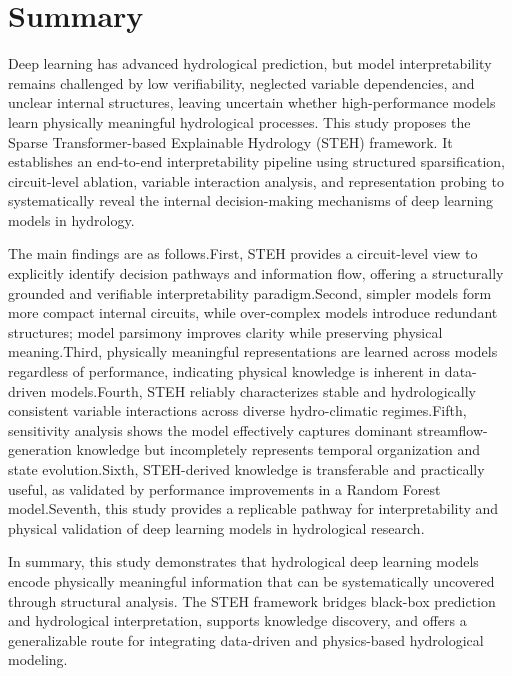\section{Summary}

Deep learning has advanced hydrological prediction, but model interpretability remains challenged by low verifiability, neglected variable dependencies\cite{e24050687_Shap_problem}, and unclear internal structures\cite{kumar2020_Shap_problem}, leaving uncertain whether high-performance models learn physically meaningful hydrological processes\cite{ReviewOfXAI}.
This study proposes the Sparse Transformer-based Explainable Hydrology (STEH) framework. It establishes an end-to-end interpretability pipeline using structured sparsification, circuit-level ablation, variable interaction analysis\cite{wang2022interpretabilitywildcircuitindirect}, and representation probing to systematically reveal the internal decision-making mechanisms of deep learning models in hydrology.

The main findings are as follows.First, STEH provides a circuit-level view to explicitly identify decision pathways and information flow, offering a structurally grounded and verifiable interpretability paradigm.Second, simpler models form more compact internal circuits, while over-complex models introduce redundant structures; model parsimony improves clarity while preserving physical meaning.Third, physically meaningful representations are learned across models regardless of performance, indicating physical knowledge is inherent in data-driven models.Fourth, STEH reliably characterizes stable and hydrologically consistent variable interactions across diverse hydro-climatic regimes.Fifth, sensitivity analysis shows the model effectively captures dominant streamflow-generation knowledge but incompletely represents temporal organization and state evolution.Sixth, STEH-derived knowledge is transferable and practically useful, as validated by performance improvements in a Random Forest model.Seventh, this study provides a replicable pathway for interpretability and physical validation of deep learning models in hydrological research.

In summary, this study demonstrates that hydrological deep learning models encode physically meaningful information that can be systematically uncovered through structural analysis. The STEH framework bridges black-box prediction and hydrological interpretation, supports knowledge discovery, and offers a generalizable route for integrating data-driven and physics-based hydrological modeling.
